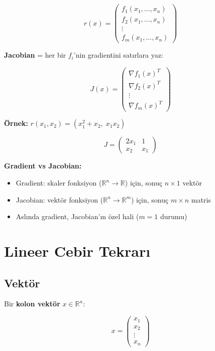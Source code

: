\documentclass[12pt,a4paper]{article}
\theoremstyle{definition}
\theoremstyle{remark}
\begin{document}
\[
r(x) = \begin{pmatrix} f_1(x_1, \ldots, x_n) \\ f_2(x_1, \ldots, x_n) \\ \vdots \\ f_m(x_1, \ldots, x_n) \end{pmatrix}
\]

\textbf{Jacobian} = her bir $f_i$'nin gradientini sat{\i}rlara yaz:

\[
J(x) = \begin{pmatrix} \nabla f_1(x)^T \\ \nabla f_2(x)^T \\ \vdots \\ \nabla f_m(x)^T \end{pmatrix}
\]

\textbf{\"Ornek:} $r(x_1, x_2) = (x_1^2 + x_2,\; x_1 x_2)$

\[
J = \begin{pmatrix} 2x_1 & 1 \\ x_2 & x_1 \end{pmatrix}
\]

\textbf{Gradient vs Jacobian:}
\begin{itemize}
    \item Gradient: skaler fonksiyon ($\mathbb{R}^n \to \mathbb{R}$) i\c{c}in, sonu\c{c} $n \times 1$ vekt\"or
    \item Jacobian: vekt\"or fonksiyon ($\mathbb{R}^n \to \mathbb{R}^m$) i\c{c}in, sonu\c{c} $m \times n$ matris
    \item Asl{\i}nda gradient, Jacobian'{\i}n \"ozel hali ($m=1$ durumu)
\end{itemize}

\newpage

\section{Lineer Cebir Tekrar{\i}}

\subsection{Vekt\"or}

Bir \textbf{kolon vekt\"or} $x \in \mathbb{R}^n$:

\[
x = \begin{pmatrix} x_1 \\ x_2 \\ \vdots \\ x_n \end{pmatrix}
\]
\end{document}
